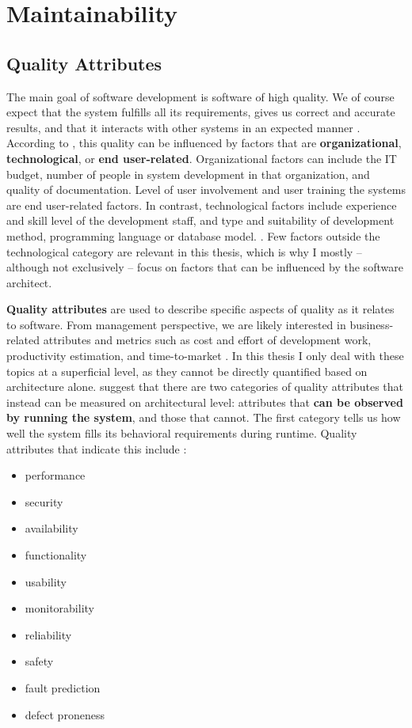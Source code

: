\documentclass[utf8,english]{gradu3}
\begin{document}
\section{Maintainability}

\subsection{Quality Attributes}

The main goal of software development is software of high quality. We of course
expect that the system fulfills all its requirements, gives us correct and
accurate results, and that it interacts with other systems in an expected manner
\parencite[76]{Bass1998}. According to \textcite[602]{Gorla2010}, this quality
can be influenced by factors that are \textbf{organizational}, \textbf{technological},
or \textbf{end user-related}. Organizational factors can include the IT budget, number of people
in system development in that organization, and quality of documentation. Level of
user involvement and user training the systems are end user-related factors. In
contrast, technological factors include experience and skill level of the
development staff, and type and suitability of development method, programming
language or database model. \parencite[602]{Gorla2010}. Few factors outside the
technological category are relevant in this thesis, which is why I mostly --
although not exclusively -- focus on factors that can be influenced by the
software architect.

\textbf{Quality attributes} are used to describe specific aspects of quality as it
relates to software. From management perspective, we are likely interested in
business-related attributes and metrics such as cost and effort of development
work, productivity estimation, and time-to-market
\parencites[60]{Arvanitou2017}[76]{Bass1998}.
In this thesis I only deal with these topics at a superficial level, as
they cannot be directly quantified based on architecture alone. \textcite[76]{Bass1998}
suggest that there are two categories of quality attributes that instead can be
measured on architectural level: attributes that \textbf{can be observed by running the
  system}, and those that cannot. The first category tells us how well the system
fills its behavioral requirements during runtime. Quality attributes that
indicate this include \parencites[79-81]{Bass1998}[13]{Li2021}[60]{Arvanitou2017}:
\begin{itemize}
  \item performance
  \item security
  \item availability
  \item functionality
  \item usability
  \item monitorability
  \item reliability
  \item safety
  \item fault prediction
  \item defect proneness
\end{itemize}
\end{document}
